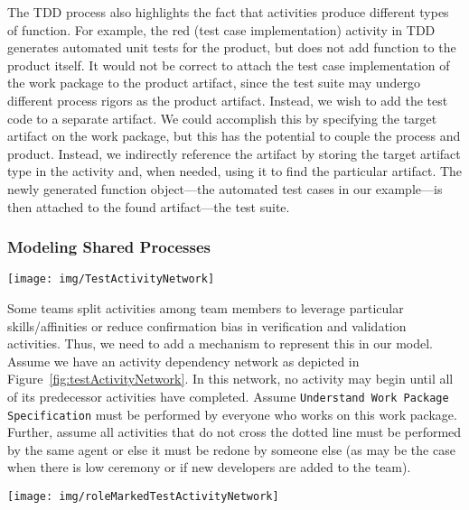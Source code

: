 The TDD process also highlights the fact that activities produce different types
of function.  For example, the red (test case implementation) activity in TDD
generates automated unit tests for the product, but does not add function to the
product itself.  It would not be correct to attach the test case implementation
of the work package to the product artifact, since the test suite may undergo
different process rigors as the product artifact.  Instead, we wish to add the
test code to a separate artifact.  We could accomplish this by specifying the
target artifact on the work package, but this has the potential to couple the
process and product.  Instead, we indirectly reference the artifact by storing
the target artifact type in the activity and, when needed, using it to find the
particular artifact.  The newly generated function object---the automated test
cases in our example---is then attached to the found artifact---the test suite.


\subsubsection{Modeling Shared Processes}

\begin{figure*}[h!t!b]
    \centering
        \texttt{[image: img/TestActivityNetwork]}
        \caption{Example activity dependency network (arrows point to successors).}
    \label{fig:testActivityNetwork}
\end{figure*}


Some teams split activities among team members to leverage particular
skills/affinities or reduce confirmation bias in verification and validation
activities.  Thus, we need to add a mechanism to represent this in our model.
Assume we have an activity dependency network as depicted in
Figure~\ref{fig:testActivityNetwork}.
In this network, no activity may begin until all of its predecessor activities
have completed.  Assume \texttt{Understand Work Package Specification} must be
performed by everyone who works on this work package.  Further, assume all
activities that do not cross the dotted line must be performed by the same agent
or else it must be redone by someone else (as may be the case when there is low
ceremony or if new developers are added to the team).

\begin{figure*}[h!t!b]
    \centering
        \texttt{[image: img/roleMarkedTestActivityNetwork]}
        \caption{Example activity dependency network (arrows point to successors). 
        The role annotations are shown for a tester
        ('\texttt{T}') and developer ('\texttt{D}'). '\texttt{*!}' indicates
        that the activity must be performed by every agent.}
    \label{fig:testActivityNetwork_annotated}
\end{figure*}

